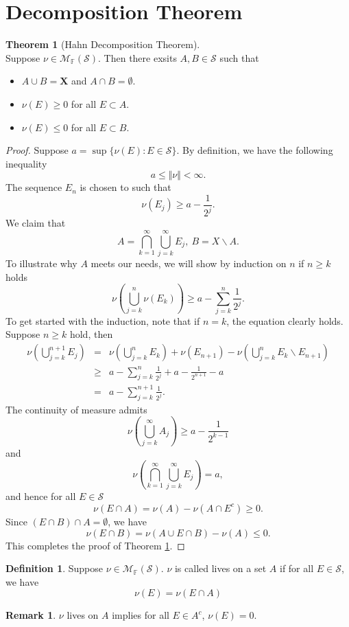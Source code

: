 \documentclass[12pt]{book}
\theoremstyle{definition}
\newtheorem{definition}{Definition}[chapter]
\newtheorem{theorem}{Theorem}[chapter]
\newtheorem{remark}{Remark}
\newcommand{\F}{\mathbb{F}}
\newcommand{\X}{\mathbf{X}}
\newcommand{\M}{\mathcal{M}}
\newcommand{\Sum}[2]{{\sum_{#1}^{#2}}}
\newcommand{\Union}[2]{{\bigcup_{#1}^{#2}}}
\newcommand{\Intersection}[2]{{\bigcap_{#1}^{#2}}}
\begin{document}
\section{Decomposition Theorem}
\begin{theorem}[Hahn Decomposition Theorem]\label{Hahn} \ \\
Suppose $\nu \in \M_\F(\mathcal S)$. Then there exsits $A,B\in \mathcal S$ such that
\begin{itemize}
	\item $A\cup B=\X$ and $A \cap B =\emptyset$.
	\item $\nu(E) \geq 0$ for all $E \subset A$.
	\item $\nu(E) \leq 0$ for all $E \subset B$.
\end{itemize}
\begin{proof}
Suppose $a = \sup\{\nu(E):E\in \mathcal S\}$. By definition, we have the following inequality
$$
a\leq \Vert \nu \Vert < \infty.
$$
The sequence $E_n$ is chosen to such that 
$$
\nu(E_j) \geq a - \frac{1}{2^j}.
$$
We claim that 
$$
A = \Intersection{k=1}{\infty}\Union{j=k}{\infty	} E_j, \ B = X\backslash A.
$$
To illustrate why $A$ meets our needs, we will show by induction on $n$ if $n\geq k$ holds
$$
\nu(\Union{j=k}{n}\nu(E_k)) \geq a - \Sum{j=k}{n	}\frac{1}{2^j}.
$$
To get started with the induction, note that if $n=k$, the equation clearly holds.
Suppose $n \geq k$ hold, then
\begin{eqnarray*}
	\nu(\Union{j=k}{n+1}E_j) &=& \nu(\Union{j=k}{n}E_k)+\nu(E_{n+1}) - \nu(\Union{j=k}{n}E_k \backslash E_{n+1}) \\
	&\geq& a - \Sum{j=k}{n}\frac{1}{2^j}+a - \frac{1}{2^{n+1}}-a \\
	&=& a-\Sum{j=k}{n+1}\frac{1}{2^j}.
\end{eqnarray*}
The continuity of measure admits 
$$
\nu(\Union{j=k}{\infty}A_j) \geq a-\frac{1}{2^{k-1}}
$$
and 
$$
\nu(\Intersection{k=1}{\infty}\Union{j=k}{\infty	} E_j)=a,
$$
and hence for all $E\in \mathcal S$ 
$$
\nu(E \cap A) = \nu(A) - \nu(A\cap E^c) \geq 0.
$$
Since $(E\cap B)\cap A =\emptyset$, we have
$$
\nu(E \cap B) = \nu(A\cup E \cap B)-\nu(A) \leq 0.
$$
This completes the proof of Theorem \ref{Hahn}.
\end{proof}
\end{theorem}

\begin{definition}
Suppose $\nu \in \M_\F(\mathcal S)$. $\nu$ is called lives on a set $A$ if for all $E\in \mathcal S$, we have
$$
\nu(E) = \nu(E\cap A)
$$ 	
\end{definition}
\begin{remark}
$\nu$ lives on $A$ implies for all $E \in A^c$, $\nu(E)=0$.	
\end{remark}
\end{document}
